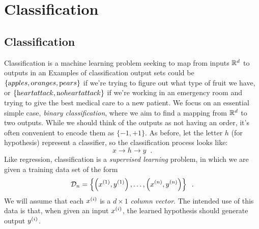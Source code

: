 \chapter{Classification}
\label{chap-classification}

\section{Classification}

Classification is a machine learning problem seeking to map from
inputs $\mathbb{R}^d$ to outputs in an 
Examples of classification output sets could be $\{{\text apples}, {\text oranges}, {\text pears}\}$ if we're
trying to figure out what type of fruit we have, or
$\{{\text heart attack}, {\text no heart attack}\}$ if we're working in an emergency
room and trying to give the best medical care to a new patient.
We focus on an essential simple
case, {\em binary classification}, where we aim to find a mapping from $\mathbb{R}^d$ to
two outputs. 
While we should think of the outputs as not having an order, it's
often convenient to encode them as $\{-1, +1\}$.  As before, let the letter $h$ (for
hypothesis) represent a classifier, so the classification process
looks like:
$$ x \rightarrow \boxed{h} \rightarrow y \;\;.$$
%
%
Like regression, classification is a {\em{supervised learning}} problem, in which we
are given a training data set of the form
\[ {\cal D}_n = \left\{\left(x^{(1)}, y^{(1)}\right), \dots, \left(x^{(n)},
  y^{(n)}\right)\right\} \;\;.\]
We will assume that each $x^{(i)}$ is a $d \times 1$ {\em column
    vector}. The intended use of this data is that, when given an input
$x^{(i)}$, the learned hypothesis should generate output
$y^{(i)}$.

